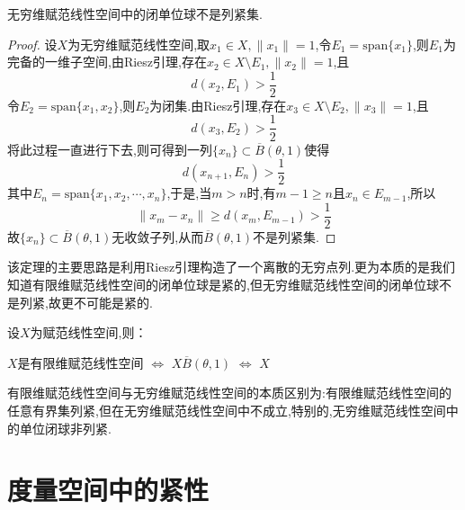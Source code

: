 \documentclass[lang=cn,18pt]{elegantbook}
\begin{document}
\begin{theorem}
    无穷维赋范线性空间中的闭单位球不是列紧集.
\end{theorem}

\begin{proof}
    设$X$为无穷维赋范线性空间,取$x_1 \in X,\|x_1\|=1$,令$E_1 = \text{span}\{x_1\}$,则$E_1$为完备的一维子空间,由Riesz引理,存在$x_2 \in X \setminus E_1,\|x_2\|=1$,且
$$d(x_2,E_1)>\frac{1}{2}$$
令$E_2=\text{span}\{x_1,x_2\}$,则$E_2$为闭集.由Riesz引理,存在$x_3 \in X\setminus E_2,\|x_3\|=1$,且
$$d(x_3,E_2)>\frac{1}{2}$$
将此过程一直进行下去,则可得到一列$\{x_n\} \subset \overline{B}(\theta,1)$使得
$$d(x_{n+1},E_{n})>\frac{1}{2}$$
其中$E_n=\text{span}\{x_1,x_2,\cdots ,x_n\}$,于是,当$m>n$时,有$m-1 \geqslant n$且$x_n \in E_{m-1}$,所以
$$\|x_m -x_n\| \geqslant d(x_m,E_{m-1})>\frac{1}{2}$$
故$\{x_n\} \subset \overline{B}(\theta,1)$无收敛子列,从而$\overline{B}(\theta,1)$不是列紧集.
\end{proof}
\begin{note}
    该定理的主要思路是利用Riesz引理构造了一个离散的无穷点列.更为本质的是我们知道有限维赋范线性空间的闭单位球是紧的,但无穷维赋范线性空间的闭单位球不是列紧,故更不可能是紧的.
\end{note}

\begin{corollary}{\textreferencemark}
    设$X$为赋范线性空间,则：
    
    $X$是有限维赋范线性空间 $\Longleftrightarrow$ $X$$ \overline{B}(\theta,1)$ $\Longleftrightarrow$ $X$
\end{corollary}

\begin{conclusion}
    有限维赋范线性空间与无穷维赋范线性空间的本质区别为:有限维赋范线性空间的任意有界集列紧,但在无穷维赋范线性空间中不成立,特别的,无穷维赋范线性空间中的单位闭球非列紧.
\end{conclusion}

\section{度量空间中的紧性}
\end{document}
